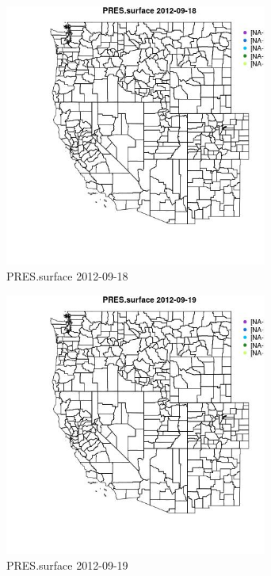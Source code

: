 \begin{figure} 
\centering  
\includegraphics[width=0.77\textwidth]{Code_Outputs/ML_input_report_ML_input_PM25_Step5_part_d_de_duplicated_aves_ML_input_MapObsPRESsurface2012-09-18.jpg} 
\caption{\label{fig:ML_input_report_ML_input_PM25_Step5_part_d_de_duplicated_aves_ML_inputMapObsPRESsurface2012-09-18}PRES.surface 2012-09-18} 
\end{figure} 
 

\begin{figure} 
\centering  
\includegraphics[width=0.77\textwidth]{Code_Outputs/ML_input_report_ML_input_PM25_Step5_part_d_de_duplicated_aves_ML_input_MapObsPRESsurface2012-09-19.jpg} 
\caption{\label{fig:ML_input_report_ML_input_PM25_Step5_part_d_de_duplicated_aves_ML_inputMapObsPRESsurface2012-09-19}PRES.surface 2012-09-19} 
\end{figure} 
 


